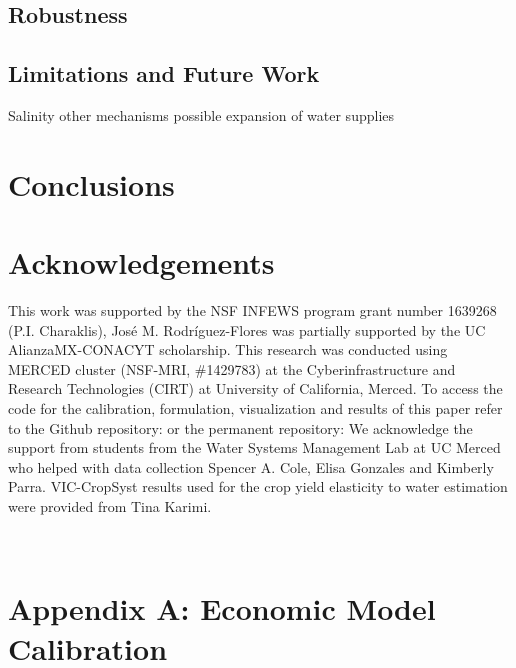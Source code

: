 \documentclass[11pt,a4paper]{article}
\begin{document}
\subsection{Robustness}

\subsection{Limitations and Future Work}

Salinity other mechanisms possible expansion of water supplies 

\section{Conclusions}

\section{Acknowledgements}

This work was supported by the NSF INFEWS program grant number 1639268 (P.I. Charaklis), José M. Rodríguez-Flores was partially supported by the UC AlianzaMX-CONACYT scholarship. This research was conducted using MERCED cluster (NSF-MRI, \#1429783) at the Cyberinfrastructure and Research Technologies (CIRT) at University of California, Merced. To access the code for the calibration, formulation, visualization and results of this paper refer to the Github repository: or the permanent repository: We acknowledge the support from students from the Water Systems Management Lab at UC Merced who helped with data collection Spencer A. Cole, Elisa Gonzales and Kimberly Parra. VIC-CropSyst results used for the crop yield elasticity to water estimation were provided from Tina Karimi.  

\appendix
\renewcommand\thefigure{\thesection.\arabic{figure}} 
\setcounter{figure}{0}  
\renewcommand{\theequation}{\thesection.\arabic{equation}}\
\setcounter{equation}{0} 
\renewcommand{\thetable}{\thesection.\arabic{table}}\
\setcounter{table}{0} 

\section{Appendix A: Economic Model Calibration}
\end{document}
